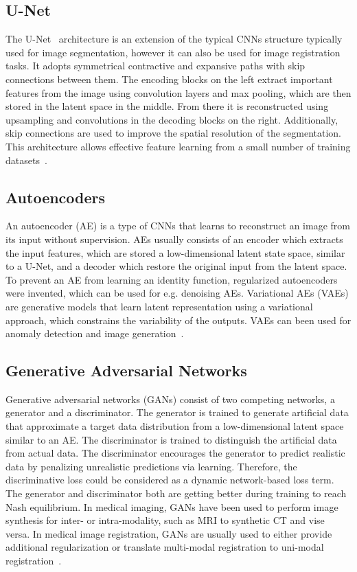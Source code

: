 \documentclass[english,version-2022-01]{uzl-thesis} %
\begin{document}
\subsection{U-Net} \label{SubSec:U-Net}
The U-Net~\cite{U-Net} architecture is an extension of the typical CNNs structure typically used for image segmentation, however it can also be used for image registration tasks. It adopts symmetrical contractive and expansive paths with skip connections between them. The encoding blocks on the left extract important features from the image using convolution layers and max pooling, which are then stored in the latent space in the middle. From there it is reconstructed using upsampling and convolutions in the decoding blocks on the right. Additionally, skip connections are used to improve the spatial resolution of the segmentation. This architecture allows effective feature learning from a small number of training datasets~\cite{Fu2020}. 

\subsection{Autoencoders} \label{SubSec:Autoencoders}
An autoencoder (AE) is a type of CNNs that learns to reconstruct an image from its input without supervision. AEs usually consists of an encoder which extracts the input features, which are stored a low-dimensional latent state space, similar to a U-Net, and a decoder which restore the original input from the latent space. To prevent an AE from learning an identity function, regularized autoencoders were invented, which can be used for e.g. denoising AEs. Variational AEs (VAEs) are generative models that learn latent representation using a variational approach, which constrains the variability of the outputs. VAEs can been used for anomaly detection and image generation~\cite{Fu2020}.

\subsection{Generative Adversarial Networks} \label{SubSec:GANs}
Generative adversarial networks (GANs) consist of two competing networks, a generator and a discriminator. The generator is trained to generate artificial data that approximate a target data distribution from a low-dimensional latent space similar to an AE. The discriminator is trained to distinguish the artificial data from actual data. The discriminator encourages the generator to predict realistic data by penalizing unrealistic predictions via learning. Therefore, the discriminative loss could be considered as a dynamic network-based loss term. The generator and discriminator both are getting better during training to reach Nash equilibrium. In medical imaging, GANs have been used to perform image synthesis for inter- or intra-modality, such as MRI to synthetic CT and vise versa. In medical image registration, GANs are usually used to either provide additional regularization or translate multi-modal registration to uni-modal registration~\cite{Fu2020}.
\end{document}
